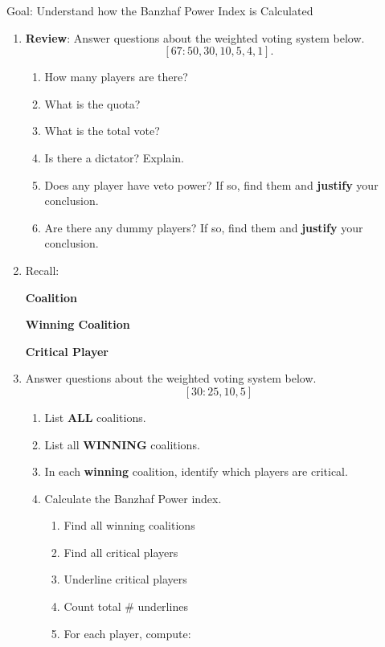 \documentclass[12pt]{article}
\renewcommand{\emph}[1]{\textsf{\textbf{#1}}}
\begin{document}
Goal: Understand how the Banzhaf Power Index is Calculated 
\begin{enumerate}
\item \textbf{Review}: Answer questions about the weighted voting system below.
$$[67: 50,30,10,5,4,1].$$
	\begin{enumerate}
	\item How many players are there? \underline{\hspace{.5in}}\\
	\item What is the quota? \underline{\hspace{.5in}}\\
	\item What is the total vote? \underline{\hspace{.5in}}\\
	\item Is there a dictator? Explain.\\
	\vfill
	\item Does any player have veto power? If so, find them and \emph{justify} your conclusion.\\
	\vfill
	\item Are there any dummy players? If so, find them and \emph{justify} your conclusion.\\
	\vfill
	\end{enumerate}
\item Recall:

\emph{ Coalition}

\vfill

\emph{  Winning Coalition}

\vfill

\emph{ Critical Player}

\vfill



\newpage
\item Answer questions about the weighted voting system below.
$$[30: 25, 10, 5]$$
	\begin{enumerate}
	\item List \emph{ALL} coalitions.
	\vfill
	\item List all \emph{WINNING} coalitions.
	\vfill
	\item In each \emph{winning} coalition, identify which players are critical.
	\vfill
	\item Calculate the Banzhaf Power index.
\begin{enumerate}
\item Find all winning coalitions
\item Find all critical players
\item Underline critical players
\item Count total \# underlines
\item For each player, compute:
\end{enumerate}

	
	\vfill
	\end{enumerate}
	

\end{enumerate}
\end{document}
